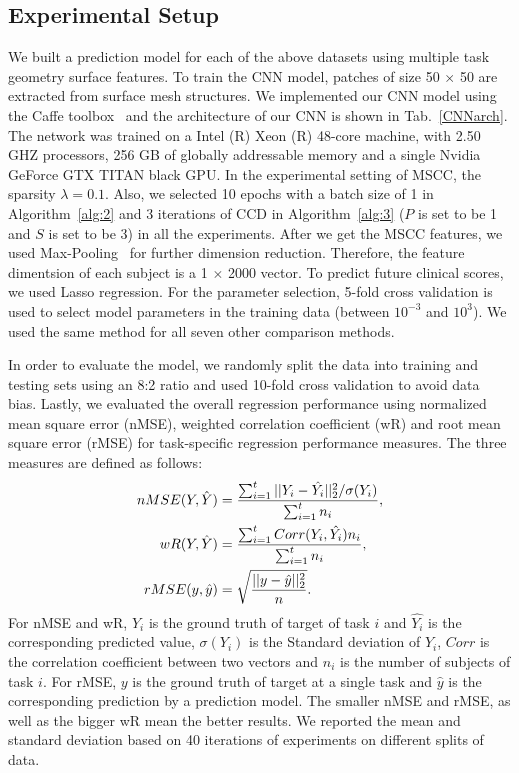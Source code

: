 \documentclass[10pt,twocolumn,letterpaper]{article}
\begin{document}
\subsection{Experimental Setup}
We built a prediction model for each of the above datasets using multiple task geometry surface features. To train the CNN model, patches of size 50 $\times$ 50 are extracted from surface mesh structures. We implemented our CNN model using the Caffe toolbox~\cite{jia2014caffe} and the architecture of our CNN is shown in Tab.~\ref{CNNarch}. The network was trained on a Intel (R) Xeon (R) 48-core machine, with 2.50 GHZ processors, 256 GB of globally addressable memory and a single Nvidia GeForce GTX TITAN black GPU. In the experimental setting of MSCC, the sparsity $\lambda = 0.1$. Also, we selected 10 epochs with a batch size of 1 in Algorithm~\ref{alg:2} and 3 iterations of CCD in Algorithm~\ref{alg:3} ($P$ is set to be 1 and $S$ is set to be 3) in all the experiments.   After we get the MSCC features, we used Max-Pooling~\cite{boureau2010theoretical} for further dimension reduction. Therefore, the feature dimentsion of each subject is a 1 $\times$ 2000 vector. To predict future clinical scores, we used Lasso regression. For the parameter selection, 5-fold cross validation is used to select model parameters in the training data (between $10^{-3}$ and $10^3$). We used the same method for all seven other comparison methods.

In order to evaluate the model, we randomly split the data into training and testing sets using an 8:2 ratio and used 10-fold cross validation to avoid data bias. Lastly, we evaluated the overall regression performance using normalized mean square error (nMSE), weighted correlation coefficient (wR) and root mean square error (rMSE) for task-specific regression performance measures. The three measures are defined as follows:
\begin{equation*}
\begin{split}
\vspace{-0.5em}
 nMSE(Y, \hat{Y})&=\frac{\sum_{i=1}^t||Y_i-\hat{Y_i}||_2^2/\sigma(Y_i)}{\sum_{i=1}^t n_i},\\
wR(Y, \hat{Y})&=\frac{\sum_{i=1}^tCorr(Y_i, \hat{Y_i})n_i}{\sum_{i=1}^t n_i},\\
rMSE(y, \hat{y})&=\sqrt{\frac{||y-\hat{y}||_2^2}{n}}.
\end{split}
\end{equation*}
For nMSE and wR, $Y_i$ is the ground truth of target of task $i$ and $\hat{Y_i}$ is the corresponding predicted value, $\sigma(Y_i)$ is the Standard deviation of $Y_i$, $Corr$ is the correlation coefficient between two vectors and $n_i$ is the number of subjects of task $i$. For rMSE, $y$ is the ground truth of target at a single task and $\hat{y}$ is the corresponding prediction by a prediction model. The smaller nMSE and rMSE, as well as the bigger wR mean the better results. We reported the mean and standard deviation based on 40 iterations of experiments on different splits of data.
\end{document}
